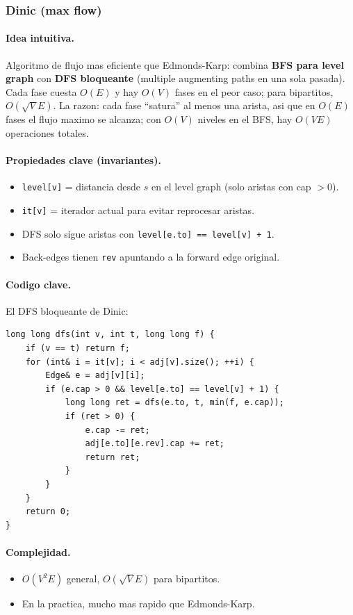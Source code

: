 ﻿\subsubsection{Dinic (max flow)}

\paragraph{Idea intuitiva.}
Algoritmo de flujo mas eficiente que Edmonds-Karp: combina \textbf{BFS para level graph} con \textbf{DFS bloqueante} (multiple augmenting paths en una sola pasada). Cada fase cuesta $O(E)$ y hay $O(V)$ fases en el peor caso; para bipartitos, $O(\sqrt{V} E)$. La razon: cada fase ``satura'' al menos una arista, asi que en $O(E)$ fases el flujo maximo se alcanza; con $O(V)$ niveles en el BFS, hay $O(VE)$ operaciones totales.

\paragraph{Propiedades clave (invariantes).}
\begin{itemize}\setlength\itemsep{0pt}
	\item \texttt{level[v]} = distancia desde $s$ en el level graph (solo aristas con cap $> 0$).
	\item \texttt{it[v]} = iterador actual para evitar reprocesar aristas.
	\item DFS solo sigue aristas con \texttt{level[e.to] == level[v] + 1}.
	\item Back-edges tienen \texttt{rev} apuntando a la forward edge original.
\end{itemize}

\paragraph{Codigo clave.}
El DFS bloqueante de Dinic:
\begin{verbatim}
long long dfs(int v, int t, long long f) {
    if (v == t) return f;
    for (int& i = it[v]; i < adj[v].size(); ++i) {
        Edge& e = adj[v][i];
        if (e.cap > 0 && level[e.to] == level[v] + 1) {
            long long ret = dfs(e.to, t, min(f, e.cap));
            if (ret > 0) {
                e.cap -= ret;
                adj[e.to][e.rev].cap += ret;
                return ret;
            }
        }
    }
    return 0;
}
\end{verbatim}

\paragraph{Complejidad.}
\begin{itemize}\setlength\itemsep{0pt}
	\item $O(V^2 E)$ general, $O(\sqrt{V} E)$ para bipartitos.
	\item En la practica, mucho mas rapido que Edmonds-Karp.
\end{itemize}

